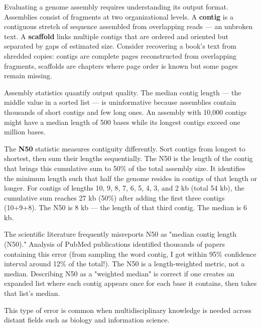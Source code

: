 \begin{commentary}
Evaluating a genome assembly requires understanding its output format. Assemblies consist of fragments at two organizational levels. A \textbf{contig} is a contiguous stretch of sequence assembled from overlapping reads — an unbroken text. A \textbf{scaffold} links multiple contigs that are ordered and oriented but separated by gaps of estimated size. Consider recovering a book's text from shredded copies: contigs are complete pages reconstructed from overlapping fragments, scaffolds are chapters where page order is known but some pages remain missing.

Assembly statistics quantify output quality. The median contig length — the middle value in a sorted list — is uninformative because assemblies contain thousands of short contigs and few long ones. An assembly with 10,000 contigs might have a median length of 500 bases while its longest contigs exceed one million bases.

The \textbf{N50} statistic measures contiguity differently. Sort contigs from longest to shortest, then sum their lengths sequentially. The N50 is the length of the contig that brings this cumulative sum to 50\% of the total assembly size. It identifies the minimum length such that half the genome resides in contigs of that length or longer. For contigs of lengths 10, 9, 8, 7, 6, 5, 4, 3, and 2 kb (total 54 kb), the cumulative sum reaches 27 kb (50\%) after adding the first three contigs (10+9+8). The N50 is 8 kb — the length of that third contig. The median is 6 kb.

The scientific literature frequently misreports N50 as "median contig length (N50)." Analysis of PubMed publications identified thousands of papers containing this error (from sampling the word contig, I got within 95\% confidence interval around 12\% of the total!). The N50 is a length-weighted metric, not a median. Describing N50 as a "weighted median" is correct if one creates an expanded list where each contig appears once for each base it contains, then takes that list's median.

This type of error is common when multidisciplinary knowledge is needed across distant fields such as biology and information science.
\end{commentary}

